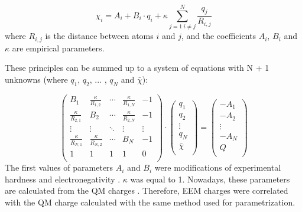 \begin{equation}
    \chi_i = A_i + B_i \cdot q_i + \kappa \sum^N_{j=1 \: i\neq{j}} \frac{q_j}{R_{i,j}} 
\end{equation}
where $R_{i,j}$ is the distance between atoms $i$ and $j$, and the coefficients
$A_i$, $B_i$ and $\kappa$ are empirical parameters. 

These principles can be summed up to a system of equations with N + 1 unknowns
(where $q_1$, $q_2$, ... , $q_N$ and $\bar{\chi}$):

\begin{equation} \label{eq:eem}
    \left(
    \begin{array}{ccccc}
        B_1                    & \frac{\kappa}{R_{1,2}} & \cdots & \frac{\kappa}{R_{1,N}} & -1     \\
        \frac{\kappa}{R_{2,1}} & B_2                    & \cdots & \frac{\kappa}{R_{2,N}} & -1     \\
        \vdots                 & \vdots                 & \ddots & \vdots                 & \vdots \\
        \frac{\kappa}{R_{N,1}} & \frac{\kappa}{R_{N,2}} & \cdots & B_N                    & -1     \\ 
        1                      & 1                      & 1      & 1                      & 0      \\  
    \end{array}
    \right) \cdot
    \left(
    \begin{array}{c}
        q_1        \\
        q_2        \\
        \vdots     \\
        q_N        \\
        \bar{\chi} \\
    \end{array}
    \right) =
    \left(
    \begin{array}{c}
        -A_1   \\
        -A_2   \\
        \vdots \\
        -A_N   \\
        Q      \\
    \end{array}
    \right)
\end{equation}
The first values of parameters $A_i$ and $B_i$ were modifications
of experimental hardness and electronegativity \cite{Mortier1986}. $\kappa$ was
equal to 1. Nowadays, these parameters are calculated from the QM
charges \cite{Baekelandt1991, Bultinck2002, Bultinck2004,
Chaves2006, Svobodova2007, Jirouskova2009, Ouyang2009}.
Therefore, EEM charges were correlated with the QM
charge calculated with the same method used for parametrization.

